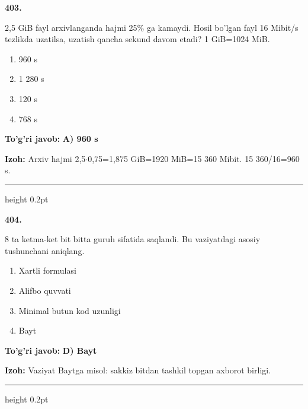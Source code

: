 \documentclass[10pt,a4paper,oneside]{article}
\begin{document}
\noindent\textbf{\color{ink}403.}
\par
2,5 GiB fayl arxivlanganda hajmi 25\% ga kamaydi. Hosil bo'lgan fayl 16 Mibit/s tezlikda uzatilsa, uzatish qancha sekund davom etadi? 1 GiB=1024 MiB.
\begin{enumerate}[label=\Alph*),leftmargin=9mm]
\item 960 s
\item 1 280 s
\item 120 s
\item 768 s
\end{enumerate}
\begin{tcolorbox}[enhanced,breakable,colback=teal!4,colframe=teal!50!black,boxrule=0.5pt,arc=1.1mm,left=3mm,right=3mm,top=1.7mm,bottom=1.7mm,before skip=2mm,after skip=2mm]
\textbf{\color{teal}To'g'ri javob:} \textbf{A) 960 s}
\par\smallskip
\textbf{Izoh:} Arxiv hajmi 2,5\ensuremath{\cdot}0,75=1,875 GiB=1920 MiB=15 360 Mibit. 15 360/16=960 s.
\end{tcolorbox}
\vspace{2mm}\hrule height 0.2pt \vspace{3mm}

\noindent\textbf{\color{ink}404.}
\par
8 ta ketma-ket bit bitta guruh sifatida saqlandi. Bu vaziyatdagi asosiy tushunchani aniqlang.
\begin{enumerate}[label=\Alph*),leftmargin=9mm]
\item Xartli formulasi
\item Alifbo quvvati
\item Minimal butun kod uzunligi
\item Bayt
\end{enumerate}
\begin{tcolorbox}[enhanced,breakable,colback=teal!4,colframe=teal!50!black,boxrule=0.5pt,arc=1.1mm,left=3mm,right=3mm,top=1.7mm,bottom=1.7mm,before skip=2mm,after skip=2mm]
\textbf{\color{teal}To'g'ri javob:} \textbf{D) Bayt}
\par\smallskip
\textbf{Izoh:} Vaziyat Baytga misol: sakkiz bitdan tashkil topgan axborot birligi.
\end{tcolorbox}
\vspace{2mm}\hrule height 0.2pt \vspace{3mm}
\end{document}
